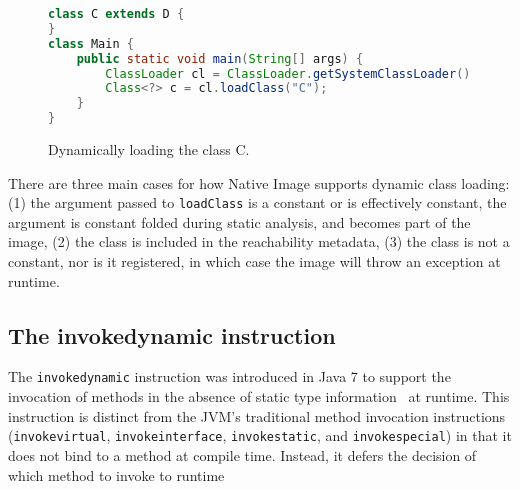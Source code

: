 \begin{figure}[h]
    \centering
\begin{lstlisting}[language=Java]
class C extends D {
}
class Main {
    public static void main(String[] args) {
        ClassLoader cl = ClassLoader.getSystemClassLoader();
        Class<?> c = cl.loadClass("C");
    }
}
\end{lstlisting}
    \caption{Dynamically loading the class C.}
    \label{fig:class_C}
\end{figure}

There are three main cases for how Native Image supports dynamic class loading: (1) the argument passed to \verb|loadClass| is a constant or is effectively constant, the argument is constant folded during static analysis, and becomes part of the image, (2) the class is included in the reachability metadata, (3) the class is not a constant, nor is it registered, in which case the image will throw an exception at runtime.


% 



\subsection{The invokedynamic instruction}
The \verb|invokedynamic| instruction was introduced in Java 7 to support the invocation of methods in the absence of static type information~\cite{noauthor_java_nodate} at runtime.
This instruction is distinct from the JVM's traditional method invocation instructions (\verb|invokevirtual|, \verb|invokeinterface|, \verb|invokestatic|, and \verb|invokespecial|) in that it does not bind to a method at compile time. Instead, it defers the decision of which method to invoke to runtime
~\cite{rose_bytecodes_2009}

